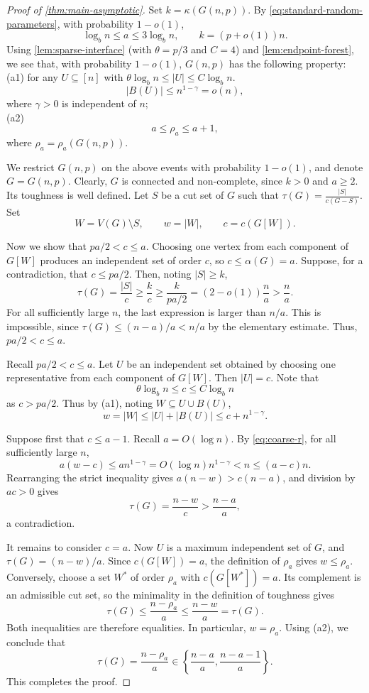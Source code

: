 \documentclass[11pt,reqno]{amsart}
\theoremstyle{definition}
\theoremstyle{remark}
\begin{document}
\begin{proof}[Proof of \cref{thm:main-asymptotic}]
 Set $k=\kappa(G(n,p))$. By \eqref{eq:standard-random-parameters}, with probability $1-o(1)$, 
\[
 \log_b n\le a\le 3\log_b n,
 \qquad k=(p+o(1))n.
\]
Using \cref{lem:sparse-interface} (with
$\theta=p/3$ and $C=4$) and 
\cref{lem:endpoint-forest}, we see that, with probability $1-o(1)$, $G(n,p)$ has the following property:\\
(a1) for any $U\subseteq[n]$ with $
 \theta\log_b n\le |U|\le C\log_b n$. \[
 |B(U)|\le n^{1-\gamma}=o(n),
\]
where $\gamma>0$ is independent of $n$;\\
 (a2) 
\[
 a\leq \rho_{a}\leq a+1,
\]
where $\rho_{a}=\rho_{a}(G(n,p))$.
 
We restrict $G(n,p)$ on the above events with probability $1-o(1)$, and denote $G=G(n,p)$. Clearly, $G$ is connected and non-complete, since $k>0$
and $a\ge2$.  Its toughness is well defined.  
Let $S$ be a cut set of $G$ such that $\tau(G)=\frac{|S|}{c(G-S)}$.  Set
\[
 W=V(G)\setminus S,\qquad w=|W|,
 \qquad c=c(G[W]).
\]

Now we show that $pa/2<c\le a$.  Choosing one vertex from each component
of $G[W]$ produces an independent set of order $c$, so $c\le\alpha(G)=a$.
Suppose, for a contradiction, that $c\le pa/2$.
Then, noting $|S|\ge k$,
\[
 \tau(G)=\frac{|S|}{c}
 \ge\frac{k}{c}
 \ge\frac{k}{pa/2}
 =(2-o(1))\frac na>\frac{n}{a}.
\]
For all sufficiently large $n$, the last expression is larger than $n/a$.
This is impossible, since $\tau(G)\leq(n-a)/a<n/a$ by the elementary
estimate. Thus, $pa/2<c\le a$.


Recall $pa/2<c\le a$.
Let $U$ be an independent set obtained by choosing one representative from each component of $G[W]$.  Then
$|U|=c$.  Note that
\[
 \theta\log_b n\le c\le C\log_b n
\] as  $c>pa/2$.
Thus by (a1), noting $W\subseteq U\cup B(U)$,
\begin{equation}\label{eq:coarse-r}
 w=|W|\le |U|+|B(U)|\le c+n^{1-\gamma}.
\end{equation}

Suppose first that $c\le a-1$. Recall $a=O(\log n)$. By
\eqref{eq:coarse-r}, for all sufficiently large $n$,
\[
 a(w-c)\le a n^{1-\gamma}
 =O(\log n)n^{1-\gamma}<n\le(a-c)n.
\]
Rearranging the strict inequality gives
$a(n-w)>c(n-a)$, and division by $ac>0$ gives
\begin{equation}\label{eq:strict-gap}
 \tau(G)=\frac{n-w}{c}>\frac{n-a}{a},
\end{equation}
a contradiction. 

It remains to consider $c=a$.  Now $U$ is a maximum independent set of
$G$, and $\tau(G)=(n-w)/a$.  Since $c(G[W])=a$, the definition of
$\rho_a$ gives $w\le\rho_a$.  Conversely, choose a set $W^*$ of order
$\rho_a$ with $c(G[W^*])=a$.  Its complement is an admissible cut set, so
the minimality in the definition of toughness gives
\[
 \tau(G)\le\frac{n-\rho_a}{a}\le\frac{n-w}{a}=\tau(G).
\]
Both inequalities are therefore equalities.  In particular, $w=\rho_a$.
Using (a2), we conclude that
\[
 \tau(G)=\frac{n-\rho_a}{a}
 \in\left\{\frac{n-a}{a},\frac{n-a-1}{a}\right\}.
\]
This completes the proof.
\end{proof}
\end{document}
